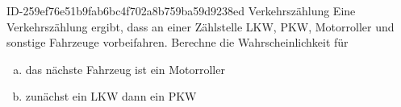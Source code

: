 \begin{exercise}
      {ID-259ef76e51b9fab6bc4f702a8b759ba59d9238ed}
      {Verkehrszählung}
  \ifproblem\problem
    Eine Verkehrszählung ergibt, dass an einer Zählstelle  LKW,  PKW,
     Motorroller und  sonstige Fahrzeuge vorbeifahren. Berechne die
    Wahrscheinlichkeit für
    \begin{enumerate}[a)]
      \item das nächste Fahrzeug ist ein Motorroller
      \item zunächst ein LKW dann ein PKW
    \end{enumerate}
  \fi
\end{exercise}
